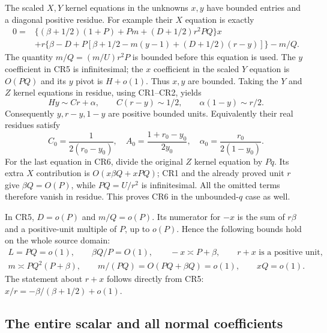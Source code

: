The scaled $X,Y$ kernel equations in the unknowns $x,y$ have
bounded entries and a diagonal positive residue. For example their
$X$ equation is exactly
\[
\begin{split}
 0={}&\{(\beta+1/2)(1+P)+Pm+(D+1/2)r^2PQ\}x\\
 &+r\{\beta-D+P[\beta+1/2-m(y-1)+(D+1/2)(r-y)]\}-m/Q.
\end{split}\tag{CR5}
\]
The quantity $m/Q=(m/U)r^2P$ is bounded before this equation is
used. The $y$ coefficient in CR5 is infinitesimal; the $x$
coefficient in the scaled $Y$ equation is $O(PQ)$ and its $y$
pivot is $H+o(1)$. Thus $x,y$ are bounded. Taking the $Y$ and
$Z$ kernel equations in residue, using CR1--CR2, yields
\[
 Hy\sim Cr+\alpha,\qquad C(r-y)\sim1/2,
 \qquad \alpha(1-y)\sim r/2.
 \tag{CR6}
\]
Consequently $y,r-y,1-y$ are positive bounded units. Equivalently
their real residues satisfy
\[
 C_0=\frac1{2(r_0-y_0)},\quad
 A_0=\frac{1+r_0-y_0}{2y_0},\quad
 \alpha_0=\frac{r_0}{2(1-y_0)}.
 \tag{CR7}
\]
For the last equation in CR6, divide the original $Z$ kernel
equation by $Pq$. Its extra $X$ contribution is
$O(x\beta Q+xPQ)$; CR1 and the already proved unit $r$ give
$\beta Q=O(P)$, while $PQ=U/r^2$ is infinitesimal. All the
omitted terms therefore vanish in residue. This proves CR6 in the
unbounded-$q$ case as well.

In CR5, $D=o(P)$ and $m/Q=o(P)$. Its numerator for $-x$ is
the sum of $r\beta$ and a positive-unit multiple of $P$, up to
$o(P)$. Hence the following bounds hold on the whole source domain:
\[
\begin{gathered}
 L=PQ=o(1),\qquad \beta Q/P=O(1),\qquad
 -x\asymp P+\beta,\qquad r+x\text{ is a positive unit},\\
 m\asymp PQ^2(P+\beta),\qquad
 m/(PQ)=O(PQ+\beta Q)=o(1),\qquad xQ=o(1).
\end{gathered}\tag{CR8}
\]
The statement about $r+x$ follows directly from CR5:
$x/r=-\beta/(\beta+1/2)+o(1)$.

\subsection{The entire scalar and all normal coefficients}

